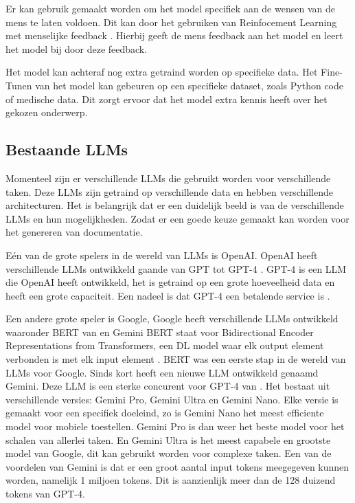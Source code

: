 Er kan gebruik gemaakt worden om het model specifiek aan de wensen van de mens te laten voldoen. Dit kan door het gebruiken van Reinfocement Learning met menselijke feedback \autocite{LambertEtAL2022}. 
Hierbij geeft de mens feedback aan het model en leert het model bij door deze feedback.

Het model kan achteraf nog extra getraind worden op specifieke data. 
Het Fine-Tunen van het model kan gebeuren op een specifieke dataset, zoals Python code of medische data.
Dit zorgt ervoor dat het model extra kennis heeft over het gekozen onderwerp.

\subsection{Bestaande LLMs}
\label{sec:bestaande-llms}

Momenteel zijn er verschillende LLMs die gebruikt worden voor verschillende taken.
Deze LLMs zijn getraind op verschillende data en hebben verschillende architecturen.
Het is belangrijk dat er een duidelijk beeld is van de verschillende LLMs en hun mogelijkheden. 
Zodat er een goede keuze gemaakt kan worden voor het genereren van documentatie.

Eén van de grote spelers in de wereld van LLMs is OpenAI. OpenAI heeft verschillende LLMs ontwikkeld gaande van GPT \autocite{RandfordEtAL2018} tot GPT-4 \autocite{OpenAI2023}.
GPT-4 is een LLM die OpenAI heeft ontwikkeld, het is getraind op een grote hoeveelheid data en heeft een grote capaciteit.
Een nadeel is dat GPT-4 een betalende service is \autocite{OpenAI2023}.

Een andere grote speler is Google, Google heeft verschillende LLMs ontwikkeld waaronder BERT van \textcite{DevlinEtAl2019} en Gemini \autocite{Google2024}
BERT staat voor Bidirectional Encoder Representations from Transformers, een DL model waar elk output element verbonden is met elk input element \autocite{CameronHashemiPour2024}.
BERT was een eerste stap in de wereld van LLMs voor Google. Sinds kort heeft \textcite{Google2024} een nieuwe LLM ontwikkeld genaamd Gemini.
Deze LLM is een sterke concurent voor GPT-4 van \textcite{OpenAI2023}. Het bestaat uit verschillende versies: Gemini Pro, Gemini Ultra en Gemini Nano. 
Elke versie is gemaakt voor een specifiek doeleind, zo is Gemini Nano het meest efficiente model voor mobiele toestellen. Gemini Pro is dan weer het beste model voor het schalen van allerlei taken.
En Gemini Ultra is het meest capabele en grootste model van Google, dit kan gebruikt worden voor complexe taken.
Een van de voordelen van Gemini is dat er een groot aantal input tokens meegegeven kunnen worden, namelijk 1 miljoen tokens.
Dit is aanzienlijk meer dan de 128 duizend tokens van GPT-4.

